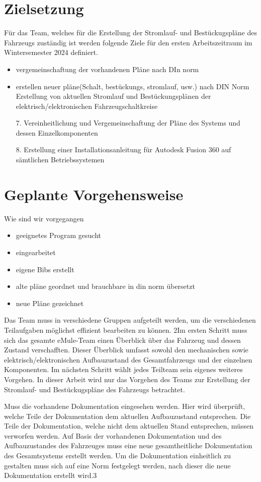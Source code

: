 \section*{Zielsetzung}
Für das Team, welches für die \glqq Erstellung der Stromlauf- und Bestückugspläne des Fahrzeugs \grqq zuständig ist werden folgende Ziele für den ersten Arbeitszeitraum im Wintersemester 2024 definiert.
\begin{itemize}
	\item vergemeinschaftung der vorhandenen Pläne nach DIn norm
	\item erstellen neuer pläne(Schalt, bestückungs, stromlauf, usw.) nach DIN Norm
	Erstellung von aktuellen Stromlauf und Bestückungsplänen der elektrisch/elektronischen Fahrzeugschaltkreise
	\item[7.] Vereinheitlichung und Vergemeinschaftung der Pläne des Systems und dessen Einzelkomponenten
	\item[8.] Erstellung einer Installationsanleitung für Autodesk Fusion 360 auf sämtlichen Betriebssystemen
\end{itemize}


\section*{Geplante Vorgehensweise}
	 Wie sind wir vorgegangen
\begin{itemize}
	\item geeignetes Program gesucht
	\item eingearbeitet
	\item eigene Bibs erstellt
	\item alte pläne geordnet und brauchbare in din norm übersetzt
	\item neue Pläne gezeichnet
\end{itemize}
Das Team muss in verschiedene Gruppen aufgeteilt werden, um die verschiedenen Teilaufgaben möglichst effizient bearbeiten zu können.
2Im ersten Schritt muss sich das gesamte eMule-Team einen Überblick über das Fahrzeug und dessen Zustand verschafften. Dieser Überblick umfasst sowohl den mechanischen sowie elektrisch/elektronischen Aufbauzustand des Gesamtfahrzeugs und der einzelnen Komponenten. Im nächsten Schritt wählt jedes Teilteam sein eigenes weiteres Vorgehen. In dieser Arbeit wird nur das Vorgehen des Teams zur \glqq Erstellung der Stromlauf- und Bestückugspläne des Fahrzeugs \grqq betrachtet. 


Muss die vorhandene Dokumentation eingesehen werden. Hier wird überprüft, welche Teile der Dokumentation dem aktuellen Aufbauzustand entsprechen. Die Teile der Dokumentation, welche nicht dem aktuellen Stand entsprechen, müssen verworfen werden. Auf Basis der vorhandenen Dokumentation und des Aufbauzustandes des Fahrzeuges muss eine neue gesamtheitliche Dokumentation des Gesamtsystems erstellt werden. Um die Dokumentation einheitlich zu gestalten muss sich auf eine Norm festgelegt werden, nach dieser die neue Dokumentation erstellt wird.3 








	
